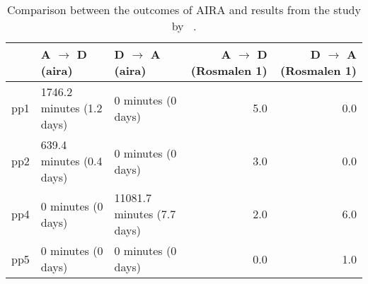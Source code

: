 \begin{table*}[ht]
\centering
\begin{tabular}{rllrr}
  \toprule
 & A $\rightarrow$ D (aira) & D $\rightarrow$ A (aira) & A $\rightarrow$ D (Rosmalen 1) & D $\rightarrow$ A (Rosmalen 1) \\ 
  \midrule
pp1 & 1746.2 minutes (1.2 days) & 0 minutes (0 days) & 5.0 & 0.0 \\ 
  pp2 & 639.4 minutes (0.4 days) & 0 minutes (0 days) & 3.0 & 0.0 \\ 
  pp4 & 0 minutes (0 days) & 11081.7 minutes (7.7 days) & 2.0 & 6.0 \\ 
  pp5 & 0 minutes (0 days) & 0 minutes (0 days) & 0.0 & 1.0 \\ 
   \bottomrule
\end{tabular}
\caption{Comparison between the outcomes of AIRA and results from the study by \citeauthor{RefWorks:4}~\cite{RefWorks:4}.} 
\label{tab:comparison}
\end{table*}
